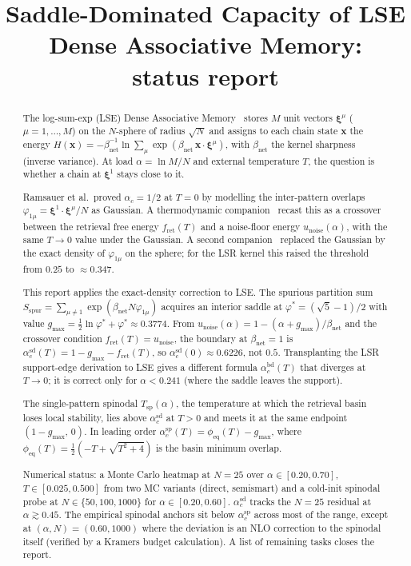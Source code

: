 \documentclass[11pt]{article}
\title{\bfseries Saddle-Dominated Capacity of LSE Dense Associative Memory:\\
status report}
\author{}
\date{}
\newcommand{\bxi}{\boldsymbol{\xi}}
\newcommand{\bx}{\bm{x}}
\newcommand{\Bnet}{\beta_{\mathrm{net}}}
\newcommand{\phieq}{\phi_{\mathrm{eq}}}
\newcommand{\fret}{f_{\mathrm{ret}}}
\newcommand{\acBd}{\alpha_c^{\mathrm{bd}}}
\newcommand{\acSd}{\alpha_c^{\mathrm{sd}}}
\newcommand{\acSp}{\alpha_c^{\mathrm{sp}}}
\newcommand{\Tsp}{T_{\mathrm{sp}}}
\begin{document}
\maketitle

\begin{abstract}
\noindent
The log-sum-exp (LSE) Dense Associative
Memory~\citep{ramsauer2021hopfield} stores $M$ unit vectors
$\bxi^\mu$ ($\mu = 1, \dots, M$) on the $N$-sphere of radius
$\sqrt{N}$ and assigns to each chain state $\bx$ the energy
$H(\bx) = -\Bnet^{-1} \ln \sum_\mu \exp(\Bnet\,\bx \cdot \bxi^\mu)$,
with $\Bnet$ the kernel sharpness (inverse variance).  At load
$\alpha = \ln M / N$ and external temperature $T$, the question is
whether a chain at $\bxi^1$ stays close to it.

Ramsauer et al.\ proved $\alpha_c = 1/2$ at $T = 0$ by modelling the
inter-pattern overlaps
$\varphi_{1\mu} = \bxi^1 \cdot \bxi^\mu / N$ as Gaussian.  A
thermodynamic companion~\citep{icml2026theory} recast this as a
crossover between the retrieval free energy $\fret(T)$ and a
noise-floor energy $u_{\mathrm{noise}}(\alpha)$, with the same
$T \to 0$ value under the Gaussian.  A second
companion~\citep{petrova2026metastable} replaced the Gaussian by the
exact density of $\varphi_{1\mu}$ on the sphere; for the LSR kernel
this raised the threshold from $0.25$ to $\approx 0.347$.

This report applies the exact-density correction to LSE.  The
spurious partition sum $S_{\mathrm{spur}} = \sum_{\mu \neq 1}
\exp(\Bnet N \varphi_{1\mu})$ acquires an interior saddle at
$\varphi^* = (\sqrt 5 - 1)/2$ with value
$g_{\max} = \tfrac12 \ln \varphi^* + \varphi^* \approx 0.3774$.  From
$u_{\mathrm{noise}}(\alpha) = 1 - (\alpha + g_{\max})/\Bnet$ and the
crossover condition $\fret(T) = u_{\mathrm{noise}}$, the boundary at
$\Bnet = 1$ is $\acSd(T) = 1 - g_{\max} - \fret(T)$, so
$\acSd(0) \approx 0.6226$, not $0.5$.  Transplanting the LSR
support-edge derivation to LSE gives a different formula
$\acBd(T)$ that diverges at $T \to 0$; it is correct only for
$\alpha < 0.241$ (where the saddle leaves the support).

The single-pattern spinodal $\Tsp(\alpha)$, the temperature at which
the retrieval basin loses local stability, lies above $\acSd$ at
$T > 0$ and meets it at the same endpoint $(1 - g_{\max},\,0)$.  In
leading order $\acSp(T) = \phieq(T) - g_{\max}$, where
$\phieq(T) = \tfrac12(-T + \sqrt{T^2 + 4})$ is the basin minimum
overlap.

Numerical status: a Monte Carlo heatmap at $N = 25$ over
$\alpha \in [0.20, 0.70]$, $T \in [0.025, 0.500]$ from two MC variants
(direct, semismart) and a cold-init spinodal probe at $N \in
\{50, 100, 1000\}$ for $\alpha \in [0.20, 0.60]$.  $\acSd$ tracks the
$N = 25$ residual at $\alpha \gtrsim 0.45$.  The empirical spinodal
anchors sit below $\acSp$ across most of the range, except at
$(\alpha, N) = (0.60, 1000)$ where the deviation is an NLO correction
to the spinodal itself (verified by a Kramers budget calculation).
A list of remaining tasks closes the report.
\end{abstract}
\end{document}
